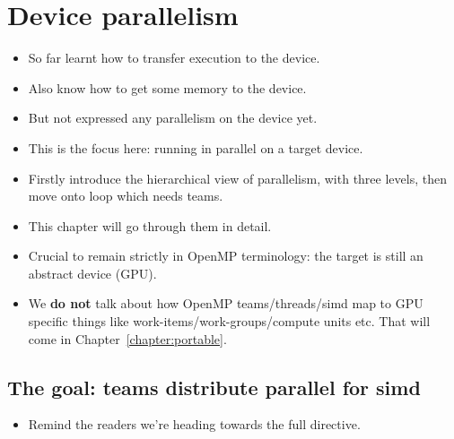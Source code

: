 
\def\ArtDir{04.DevPar/figures}%


\chapter{Device parallelism}
\label{chapter:parallelism}

\begin{itemize}
  \item So far learnt how to transfer execution to the device.
  \item Also know how to get some memory to the device.
  \item But not expressed any parallelism on the device yet.
  \item This is the focus here: running in parallel on a target device.
  \item Firstly introduce the hierarchical view of parallelism, with three levels, then move onto loop which needs teams.
  \item This chapter will go through them in detail.
  \item Crucial to remain strictly in OpenMP terminology: the target is still an abstract device (GPU).
  \item We {\bf do not} talk about how OpenMP teams/threads/simd map to GPU specific things like work-items/work-groups/compute units etc. That will come in Chapter~\ref{chapter:portable}.
\end{itemize}


\section{The goal: teams distribute parallel for simd}
\begin{itemize}
  \item Remind the readers we're heading towards the full directive.
\end{itemize}

